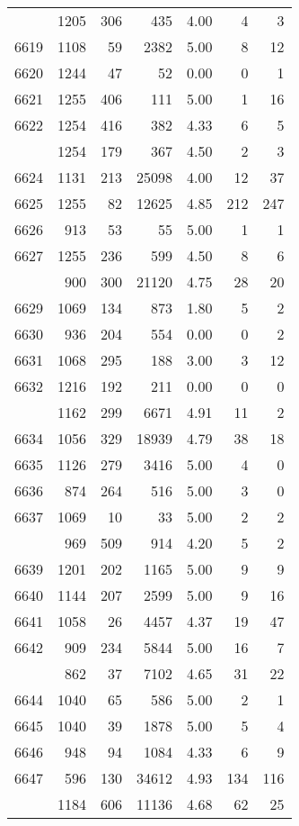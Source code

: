 \documentclass[
]{article}
\begin{document}
\begin{table}
\begin{tabular}[t]{lrrrrrr}
\addlinespace
6618 & 1205 & 306 & 435 & 4.00 & 4 & 3\\
6619 & 1108 & 59 & 2382 & 5.00 & 8 & 12\\
6620 & 1244 & 47 & 52 & 0.00 & 0 & 1\\
6621 & 1255 & 406 & 111 & 5.00 & 1 & 16\\
6622 & 1254 & 416 & 382 & 4.33 & 6 & 5\\
\addlinespace
6623 & 1254 & 179 & 367 & 4.50 & 2 & 3\\
6624 & 1131 & 213 & 25098 & 4.00 & 12 & 37\\
6625 & 1255 & 82 & 12625 & 4.85 & 212 & 247\\
6626 & 913 & 53 & 55 & 5.00 & 1 & 1\\
6627 & 1255 & 236 & 599 & 4.50 & 8 & 6\\
\addlinespace
6628 & 900 & 300 & 21120 & 4.75 & 28 & 20\\
6629 & 1069 & 134 & 873 & 1.80 & 5 & 2\\
6630 & 936 & 204 & 554 & 0.00 & 0 & 2\\
6631 & 1068 & 295 & 188 & 3.00 & 3 & 12\\
6632 & 1216 & 192 & 211 & 0.00 & 0 & 0\\
\addlinespace
6633 & 1162 & 299 & 6671 & 4.91 & 11 & 2\\
6634 & 1056 & 329 & 18939 & 4.79 & 38 & 18\\
6635 & 1126 & 279 & 3416 & 5.00 & 4 & 0\\
6636 & 874 & 264 & 516 & 5.00 & 3 & 0\\
6637 & 1069 & 10 & 33 & 5.00 & 2 & 2\\
\addlinespace
6638 & 969 & 509 & 914 & 4.20 & 5 & 2\\
6639 & 1201 & 202 & 1165 & 5.00 & 9 & 9\\
6640 & 1144 & 207 & 2599 & 5.00 & 9 & 16\\
6641 & 1058 & 26 & 4457 & 4.37 & 19 & 47\\
6642 & 909 & 234 & 5844 & 5.00 & 16 & 7\\
\addlinespace
6643 & 862 & 37 & 7102 & 4.65 & 31 & 22\\
6644 & 1040 & 65 & 586 & 5.00 & 2 & 1\\
6645 & 1040 & 39 & 1878 & 5.00 & 5 & 4\\
6646 & 948 & 94 & 1084 & 4.33 & 6 & 9\\
6647 & 596 & 130 & 34612 & 4.93 & 134 & 116\\
\addlinespace
6648 & 1184 & 606 & 11136 & 4.68 & 62 & 25\\

\end{tabular}
\end{table}
\end{document}

